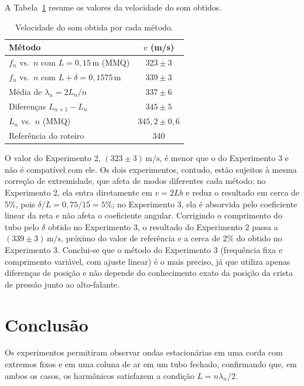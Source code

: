 \documentclass[12pt, a4paper]{article}
\newcommand{\un}[1]{\,\mathrm{#1}}
\newcommand{\fonte}[1]{\par\vspace{2pt}{\footnotesize Fonte: #1}}
\begin{document}
A Tabela~\ref{tab:comparacao} resume os valores da velocidade do som obtidos.

\begin{table}[H]
\centering
\caption{Velocidade do som obtida por cada método.}
\label{tab:comparacao}
\begin{tabular}{lc}
\toprule
Método & $v$ (m/s) \\
\midrule
$f_n$ vs.\ $n$ com $L=0{,}15\un{m}$ (MMQ) & $323\pm3$ \\
$f_n$ vs.\ $n$ com $L+\delta=0{,}1575\un{m}$ & $339\pm3$ \\
Média de $\lambda_n=2L_n/n$ & $337\pm6$ \\
Diferenças $L_{n+1}-L_n$ & $345\pm5$ \\
$L_n$ vs.\ $n$ (MMQ) & $345{,}2\pm0{,}6$ \\
\midrule
Referência do roteiro & 340 \\
\bottomrule
\end{tabular}
\fonte{Elaborada pelos autores.}
\end{table}

O valor do Experimento 2, $(323\pm3)\un{m/s}$, é menor que o do Experimento 3 e não é compatível com ele. Os dois experimentos, contudo, estão sujeitos à mesma correção de extremidade, que afeta de modos diferentes cada método: no Experimento 2, ela entra diretamente em $v=2Lb$ e reduz o resultado em cerca de $5\%$, pois $\delta/L=0{,}75/15=5\%$; no Experimento 3, ela é absorvida pelo coeficiente linear da reta e não afeta o coeficiente angular. Corrigindo o comprimento do tubo pelo $\delta$ obtido no Experimento 3, o resultado do Experimento 2 passa a $(339\pm3)\un{m/s}$, próximo do valor de referência e a cerca de $2\%$ do obtido no Experimento 3. Conclui-se que o método do Experimento 3 (frequência fixa e comprimento variável, com ajuste linear) é o mais preciso, já que utiliza apenas diferenças de posição e não depende do conhecimento exato da posição da crista de pressão junto ao alto-falante.

\section{Conclusão}

Os experimentos permitiram observar ondas estacionárias em uma corda com extremos fixos e em uma coluna de ar em um tubo fechado, confirmando que, em ambos os casos, os harmônicos satisfazem a condição $L=n\lambda_n/2$.
\end{document}
